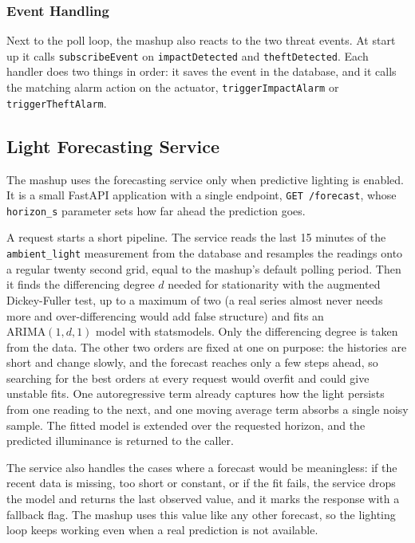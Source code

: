 \documentclass[conference]{IEEEtran}
\begin{document}
\subsubsection{Event Handling}
Next to the poll loop, the mashup also reacts to the two threat events. At start up it calls \texttt{subscribeEvent} on \texttt{impactDetected} and \texttt{theftDetected}. Each handler does two things in order: it saves the event in the database, and it calls the matching alarm action on the actuator, \texttt{triggerImpactAlarm} or \texttt{triggerTheftAlarm}.

\subsection{Light Forecasting Service}
The mashup uses the forecasting service only when predictive lighting is enabled. It is a small FastAPI application with a single endpoint, \texttt{GET /forecast}, whose \texttt{horizon\_s} parameter sets how far ahead the prediction goes.

A request starts a short pipeline. The service reads the last 15 minutes of the \texttt{ambient\_light} measurement from the database and resamples the readings onto a regular twenty second grid, equal to the mashup's default polling period. Then it finds the differencing degree $d$ needed for stationarity with the augmented Dickey-Fuller test, up to a maximum of two (a real series almost never needs more and over-differencing would add false structure) and fits an $\mathrm{ARIMA}(1, d, 1)$ model with statsmodels. Only the differencing degree is taken from the data. The other two orders are fixed at one on purpose: the histories are short and change slowly, and the forecast reaches only a few steps ahead, so searching for the best orders at every request would overfit and could give unstable fits. One autoregressive term already captures how the light persists from one reading to the next, and one moving average term absorbs a single noisy sample. The fitted model is extended over the requested horizon, and the predicted illuminance is returned to the caller.

The service also handles the cases where a forecast would be meaningless: if the recent data is missing, too short or constant, or if the fit fails, the service drops the model and returns the last observed value, and it marks the response with a fallback flag. The mashup uses this value like any other forecast, so the lighting loop keeps working even when a real prediction is not available.
\end{document}
